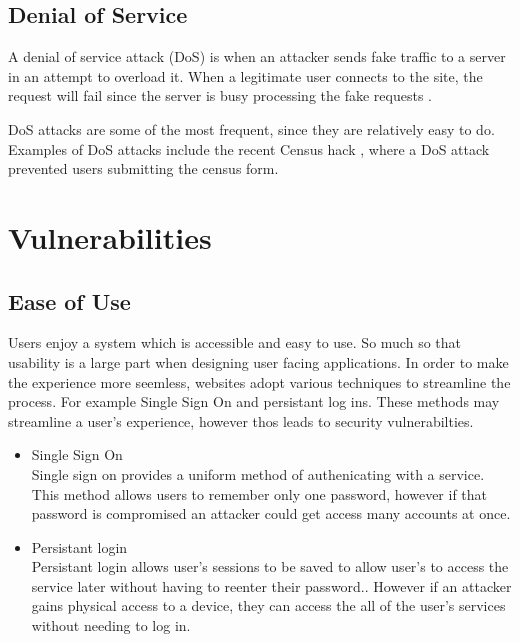 \subsection{Denial of Service}

A denial of service attack (DoS) is when an attacker sends fake traffic to a server in an attempt to overload it. When a legitimate user connects to the site, the request will fail since the server is busy processing the fake requests \cite{department_of_homeland_security_understanding_2009}.

DoS attacks are some of the most frequent, since they are relatively easy to do. Examples of DoS attacks include the recent Census hack \cite{abc_abs_2016}, where a DoS attack prevented users submitting the census form.


\section{Vulnerabilities}

\subsection{Ease of Use}

Users enjoy a system which is accessible and easy to use. So much so that usability is a large part when designing user facing applications. 
In order to make the experience more seemless, websites adopt various techniques to streamline the process. For example Single Sign On and persistant log ins. These methods may streamline a user's experience, however thos leads to security vulnerabilties\cite{javaid_secure_2013}.

\begin{itemize}
    \item Single Sign On\\
        Single sign on provides a uniform method of authenicating with a service. This method allows users to remember only one password, however if that password is compromised an attacker could get access many accounts at once.

    \item Persistant login\\
        Persistant login allows user's sessions to be saved to allow user's to access the service later without having to reenter their password.\cite{soares_secure_2013}. However if an attacker gains physical access to a device, they can access the all of the user's services without needing to log in.
\end{itemize}


